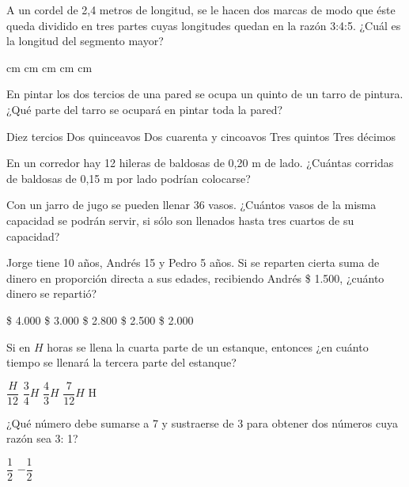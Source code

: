 \documentclass[pagina vacia]{srs}
\begin{document}
\begin{preguntas}
\pregunta A un cordel de 2,4 metros de longitud, se le hacen dos marcas de modo que éste queda dividido en tres partes cuyas longitudes quedan en la razón 3:4:5. ¿Cuál es la longitud del segmento mayor?
\begin{vertical}
 cm
 cm
 cm
 cm
 cm
\end{vertical}

\pregunta En pintar los dos tercios de una pared se ocupa un quinto de un tarro de pintura. ¿Qué parte del tarro se ocupará en pintar toda la pared?
\begin{vertical}
\alternativa Diez tercios
\alternativa Dos quinceavos
\alternativa Dos cuarenta y cincoavos
\alternativa Tres quintos
\alternativa Tres décimos
\end{vertical}

\pregunta En un corredor hay 12 hileras de baldosas de 0,20 m de lado. ¿Cuántas corridas de baldosas de 0,15 m por lado podrían colocarse?
\begin{vertical}
\end{vertical}

\pregunta Con un jarro de jugo se pueden llenar 36 vasos. ¿Cuántos vasos de la misma capacidad se podrán servir, si sólo son llenados hasta tres cuartos de su capacidad?
\begin{vertical}
\end{vertical}

\pregunta Jorge tiene 10 años, Andrés 15 y Pedro 5 años. Si se reparten cierta suma de dinero en proporción directa a sus edades, recibiendo Andrés \$ 1.500, ¿cuánto dinero se repartió?
\begin{vertical}
\alternativa \$ 4.000
\alternativa \$ 3.000
\alternativa \$ 2.800
\alternativa \$ 2.500
\alternativa \$ 2.000
\end{vertical}

\pregunta Si en $H$ horas se llena la cuarta parte de un estanque, entonces ¿en cuánto tiempo se llenará la tercera parte del estanque?
\begin{vertical}
\alternativa $\dfrac{H}{12}$
\alternativa $\dfrac{3}{4}H$
\alternativa $\dfrac{4}{3}H$
\alternativa $\dfrac{7}{12}H$
\alternativa H
\end{vertical}

\pregunta ¿Qué número debe sumarse a 7 y sustraerse de 3 para obtener dos números cuya razón sea 3: 1?
\begin{vertical}
\alternativa $\dfrac{1}{2}$
\alternativa $-\dfrac{1}{2}$
\end{vertical}


\end{preguntas}
\end{document}
